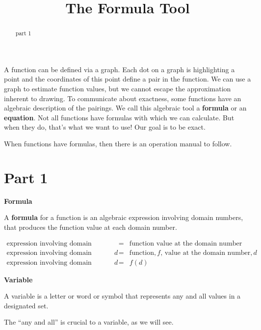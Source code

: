 \documentclass{ximera}
\title{The Formula Tool}
\begin{document}
\begin{abstract}
part 1
\end{abstract}
\maketitle



A function can be defined via a graph. Each dot on a graph is highlighting a point and the coordinates of this point define a pair in the function. We can use a graph to estimate function values, but we cannot escape the approximation inherent to drawing.  To communicate about exactness, some functions have an algebraic description of the pairings.  We call this algebraic tool a \textbf{formula} or an \textbf{equation}. Not all functions have formulas with which we can calculate.  But when they do, that's what we want to use!  Our goal is to be exact. 


When functions have formulas, then there is an operation manual to follow. 



\section*{Part 1}

\begin{definition}  \textbf{\textcolor{green!50!black}{Formula}}  

A \textbf{formula} for a function is an algebraic expression involving  domain numbers, that produces the function value at each domain number.
\end{definition}



\[
\begin{array}{rcl}
     \text{expression involving domain number} & = &  \text{function value at the domain number}  \\ 
      \text{expression involving domain number,} \, d  & = &  \text{function,} \, f \text{, value at the domain number,} \, d \\ 
      \text{expression involving domain number,} \, d & = & f(d) 
\end{array}
\]







\begin{definition}  \textbf{\textcolor{green!50!black}{Variable}}  

A variable is a letter or word or symbol that represents any and all values in a designated set.


\end{definition}
The ``any and all'' is crucial to a variable, as we will see. 
\end{document}

